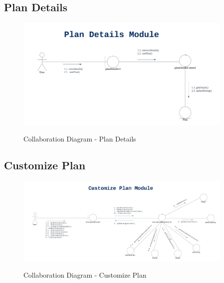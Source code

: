 \documentclass[12pt]{article}
\begin{document}
\subsection{Plan Details}
\begin{figure}[H]
    \centering
        \includegraphics[width=0.95\textwidth]{Collaboration Diagram/Plan Details.png}
        \label{fig:CollabPlanDetails}
    \caption{Collaboration Diagram - Plan Details}
\end{figure}

\newpage
\subsection{Customize Plan}
\begin{figure}[H]
    \centering
        \includegraphics[width=0.95\textwidth]{Collaboration Diagram/Customize Plan.png}
        \label{fig:CollabCustomize}
    \caption{Collaboration Diagram - Customize Plan}
\end{figure}
\end{document}
